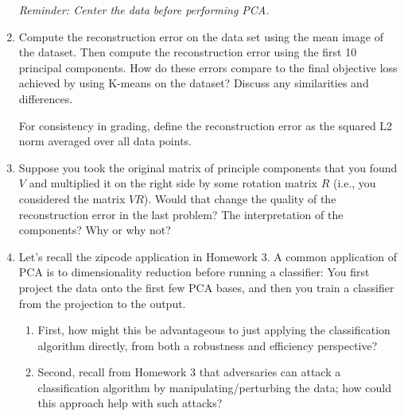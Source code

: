 \documentclass[submit]{../harvardml}
\begin{document}
\begin{problem}
\begin{enumerate}
    \textit{Reminder: Center the data before performing PCA.}

    \item Compute the reconstruction error on the data set using the mean
    image of the dataset.  Then compute the reconstruction error using
    the first 10 principal components.  How do these errors compare to
    the final objective loss achieved by using K-means on the dataset?
    Discuss any similarities and differences.

    For consistency in grading, define the reconstruction error as the squared L2
    norm averaged over all data points.

  
    \item Suppose you took the original matrix of principle components
    that you found $V$ and multiplied it on the right side by some rotation matrix $R$ (i.e., you considered the matrix $VR$).
    Would that change the quality of the reconstruction error in the
    last problem?  The interpretation of the components?  Why or why
    not?

    \item Let's recall the zipcode application in Homework 3.  A common
    application of PCA is to dimensionality reduction before running a
    classifier: You first project the data onto the first few PCA bases,
    and then you train a classifier from the projection to the output.
    \begin{enumerate}
      \item First, how might this be advantageous to just applying the classification algorithm directly, from both a robustness and efficiency perspective? 
      
      \item Second, recall from Homework 3 that adversaries can attack a classification algorithm by manipulating/perturbing the data; how could this approach help with such attacks?
    \end{enumerate}


\end{enumerate}
\end{problem}
\end{document}
